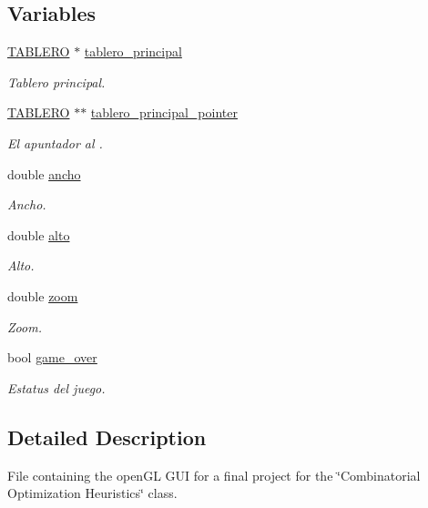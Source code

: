 \subsection*{Variables}
\begin{DoxyCompactItemize}
\item 
\hyperlink{tablero_8h_acbb1e9c862ccf810af77512ddb019a82}{T\+A\+B\+L\+E\+RO} $\ast$ \hyperlink{interfaz-grafica_8h_ad41c796ca99fa8aceaba2191d381080b}{tablero\+\_\+principal}
\begin{DoxyCompactList}\small\item\em Tablero principal. \end{DoxyCompactList}\item 
\hyperlink{tablero_8h_acbb1e9c862ccf810af77512ddb019a82}{T\+A\+B\+L\+E\+RO} $\ast$$\ast$ \hyperlink{interfaz-grafica_8h_a49c95bc75b43151a9098a1d2485b7f25}{tablero\+\_\+principal\+\_\+pointer}
\begin{DoxyCompactList}\small\item\em El apuntador al . \end{DoxyCompactList}\item 
double \hyperlink{interfaz-grafica_8h_a6f7bd0b1489ba2a87aa2ecab43bd5b15}{ancho}
\begin{DoxyCompactList}\small\item\em Ancho. \end{DoxyCompactList}\item 
double \hyperlink{interfaz-grafica_8h_a5fe56f9822f9be12ca5e80ddf9c8cb00}{alto}
\begin{DoxyCompactList}\small\item\em Alto. \end{DoxyCompactList}\item 
double \hyperlink{interfaz-grafica_8h_a9c59ed4a7b6bdc2b1207e39fabf379a4}{zoom}
\begin{DoxyCompactList}\small\item\em Zoom. \end{DoxyCompactList}\item 
bool \hyperlink{interfaz-grafica_8h_a217b738e11033b8ebfb179f8c7e72e1f}{game\+\_\+over}
\begin{DoxyCompactList}\small\item\em Estatus del juego. \end{DoxyCompactList}\end{DoxyCompactItemize}


\subsection{Detailed Description}
File containing the open\+GL G\+UI for a final project for the \char`\"{}\+Combinatorial Optimization Heuristics\char`\"{} class. 

